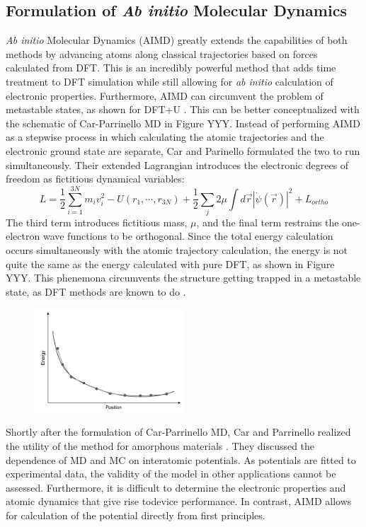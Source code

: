 \documentclass[3p,review,12pt]{elsarticle}
\begin{document}
\subsection{Formulation of \emph{Ab initio} Molecular Dynamics}
\emph{Ab initio} Molecular Dynamics (AIMD) greatly extends the capabilities of both methods by advancing atoms along classical trajectories based on forces calculated from DFT\cite{Sholl2009}.
This is an incredibly powerful method that adds time treatment to DFT simulation while still allowing for \emph{ab initio} calculation of electronic properties. Furthermore, AIMD can circumvent the problem of metastable states, as shown for DFT+U \cite{Zhang2015}. This can be better conceptualized with the schematic of Car-Parrinello MD in Figure YYY. Instead of performing AIMD as a stepwise process in which calculating the atomic trajectories and the electronic ground state are separate, Car and Parinello formulated the two to run simultaneously. Their extended Lagrangian introduces the electronic degrees of freedom as fictitious dynamical variables:
\begin{equation}
L =\frac{1}{2}\sum_{i=1}^{3N}m_{i}v^{2}_{i}-U(r_{1}, \cdots, r_{3N})+\frac{1}{2}\sum_{j}2\mu \int d\vec{r}|\dot{\psi}(\vec{r})|^{2}+L_{ortho}
\end{equation}
The third term introduces fictitious mass, $\mu$, and the final term restrains the one-electron wave functions to be orthogonal. Since the total energy calculation occurs simultaneously with the atomic trajectory calculation, the energy is not quite the same as the energy calculated with pure DFT, as shown in Figure YYY. This phenemona circumvents the structure getting trapped in a metastable state, as DFT methods are known to do \cite{Dorado2013}.
\begin{figure}[h]
	\includegraphics[width=0.5\textwidth]{practical1}
	\centering
	\caption{} 
\end{figure}

\par
Shortly after the formulation of Car-Parrinello MD, Car and Parrinello realized the utility of the method for amorphous materials \cite{Car1988}. They discussed the dependence of MD and MC on interatomic potentials. As potentials are fitted to experimental data, the validity of the model in other applications cannot be assessed. Furthermore, it is difficult to determine the electronic properties and atomic dynamics that give rise todevice performance. In contrast, AIMD allows for calculation of the potential directly from first principles.
\end{document}
